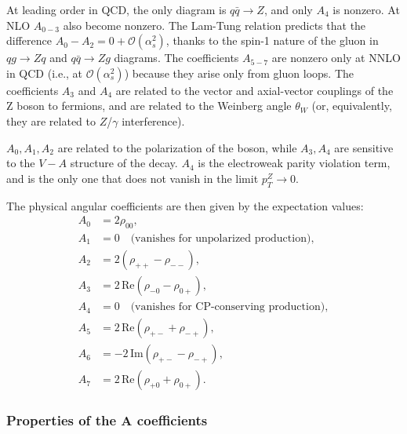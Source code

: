 \documentclass[11pt]{article}
\begin{document}
At leading order in QCD, the only diagram is $q\bar{q}\to Z$, and only $A_4$ is nonzero. 
At NLO $A_{0-3}$ also become nonzero. 
The Lam-Tung relation predicts that the difference $A_0 - A_2=0 + \mathcal{O}(\alpha_s^2)$, thanks to the spin-1 nature of the gluon in $qg\to Zq$ and $q\bar{q}\to Z g$ diagrams.
The coefficients $A_{5-7}$ are nonzero only at NNLO in QCD (i.e., at $\mathcal{O}(\alpha_s^2)$) because they arise only from gluon loops. 
The coefficients $A_3$ and $A_4$ are related to the vector and axial-vector couplings of the Z boson to fermions, and are related to the Weinberg angle $\theta_W$ (or, equivalently, they are related to $Z$/$\gamma$ interference).


$A_0,A_1,A_2$ are related to the polarization of the boson, while $A_3,A_4$ are sensitive to the $V-A$ structure of the decay. 
$A_4$ is the electroweak parity violation term, and is the only one that does not vanish in the limit $p_T^Z \to 0$. 

The physical angular coefficients are then given by the expectation values:
\begin{align}
    A_0 &= 2\rho_{00}, \\
    A_1 &= 0 \quad \text{(vanishes for unpolarized production)}, \\
    A_2 &= 2(\rho_{++} - \rho_{--}), \\
    A_3 &= 2\,\text{Re}(\rho_{-0} - \rho_{0+}), \\
    A_4 &= 0 \quad \text{(vanishes for CP-conserving production)}, \\
    A_5 &= 2\,\text{Re}(\rho_{+-} + \rho_{-+}), \\
    A_6 &= -2\,\text{Im}(\rho_{+-} - \rho_{-+}), \\
    A_7 &= 2\,\text{Re}(\rho_{+0} + \rho_{0+}).
\end{align}

\subsubsection{Properties of the A coefficients}
\end{document}
